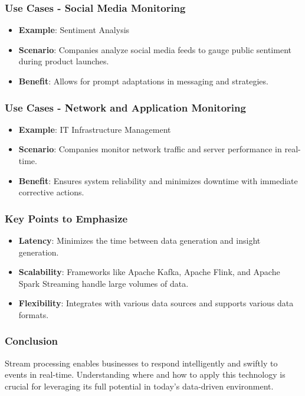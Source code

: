 \documentclass[aspectratio=169]{beamer}
\begin{document}
\begin{frame}[fragile]
    \frametitle{Use Cases - Social Media Monitoring}
    \begin{itemize}
        \item \textbf{Example}: Sentiment Analysis
        \item \textbf{Scenario}: Companies analyze social media feeds to gauge public sentiment during product launches.
        \item \textbf{Benefit}: Allows for prompt adaptations in messaging and strategies.
    \end{itemize}
\end{frame}

\begin{frame}[fragile]
    \frametitle{Use Cases - Network and Application Monitoring}
    \begin{itemize}
        \item \textbf{Example}: IT Infrastructure Management
        \item \textbf{Scenario}: Companies monitor network traffic and server performance in real-time.
        \item \textbf{Benefit}: Ensures system reliability and minimizes downtime with immediate corrective actions.
    \end{itemize}
\end{frame}

\begin{frame}[fragile]
    \frametitle{Key Points to Emphasize}
    \begin{itemize}
        \item \textbf{Latency}: Minimizes the time between data generation and insight generation.
        \item \textbf{Scalability}: Frameworks like Apache Kafka, Apache Flink, and Apache Spark Streaming handle large volumes of data.
        \item \textbf{Flexibility}: Integrates with various data sources and supports various data formats.
    \end{itemize}
\end{frame}

\begin{frame}[fragile]
    \frametitle{Conclusion}
    Stream processing enables businesses to respond intelligently and swiftly to events in real-time. Understanding where and how to apply this technology is crucial for leveraging its full potential in today's data-driven environment.
\end{frame}
\end{document}
